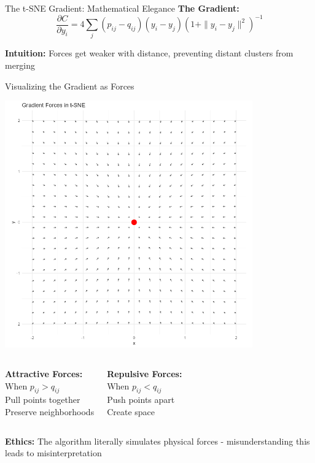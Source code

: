 \documentclass[aspectratio=169]{beamer}
\newcommand{\intuition}[1]{\colorbox{green!10}{\textcolor{intuitioncolor}{\textbf{Intuition:} #1}}}
\newcommand{\ethics}[1]{\colorbox{purple!10}{\textcolor{ethicscolor}{\textbf{Ethics:} #1}}}
\begin{document}
\begin{frame}{The t-SNE Gradient: Mathematical Elegance}
\textbf{The Gradient:}
$$\frac{\partial C}{\partial y_i} = 4\sum_j (p_{ij} - q_{ij})(y_i - y_j)(1 + \|y_i - y_j\|^2)^{-1}$$

\begin{center}
\end{center}

\intuition{Forces get weaker with distance, preventing distant clusters from merging}
\end{frame}

\begin{frame}{Visualizing the Gradient as Forces}
\begin{center}
\includegraphics[width=0.8\textwidth]{./Figures/gradient_force_field.png}
\end{center}

\begin{columns}
\textbf{Attractive Forces:}\\
When $p_{ij} > q_{ij}$\\
Pull points together\\
Preserve neighborhoods

\textbf{Repulsive Forces:}\\
When $p_{ij} < q_{ij}$\\
Push points apart\\
Create space
\end{columns}

\ethics{The algorithm literally simulates physical forces - misunderstanding this leads to misinterpretation}
\end{frame}
\end{document}
